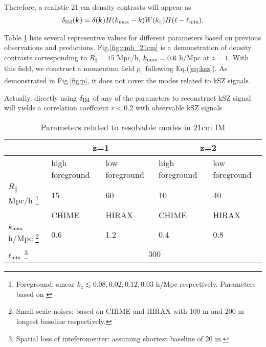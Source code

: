 Therefore, a realistic 21 cm density contrasts will appear as 
\begin{eqnarray}
\label{eq:ns}
    \delta_\mathrm{IM}(\bm{k})=\delta(\bm{k})H(k_\mathrm{max}-k)W(k_\parallel)H(\ell-\ell_\mathrm{min}),
\end{eqnarray}

Table.\ref{tab:para} 
lists several representive values for different parameters 
based on previous observations and predictions. 
Fig.\ref{fig:cmb_21cm} 
is a demonstration of density contrasts corresponding to 
$R_\parallel=15$ Mpc/h, $k_\mathrm{max}=0.6$ h/Mpc 
at $z=1$. 
With this field, 
we construct a momentum field $p_\parallel$ following Eq.(\ref{eq:ksz}). 
As demonstrated in Fig.\ref{fig:p}, 
it does not cover the modes related to kSZ signals. 

Actually, directly using $\delta_\mathrm{IM}$ of any of the parameters 
to reconstruct kSZ signal will 
yields a correlation coeffcient $r<0.2$ 
with observable kSZ signals 

\begin{table}
\begin{tabular}{|m{2cm}|m{1.5cm}|m{1.5cm}|m{1.5cm}|m{1.5cm}|}
    \hline
     & \multicolumn{2}{|c|}{z=1} &\multicolumn{2}{|c|}{z=2}\\
     \hline
     & high foreground &low foreground&high foreground& low foreground\\
     \cline{2-5}
     $R_\parallel$ Mpc/h
     \footnote{Foreground: smear $k_z\lesssim 0.08,0.02,0.12,0.03$ h/Mpc respectively. Parameters based on \cite{2013ApJ...763L..20M,Switzer13,15Shaw}}
      & 15 & 60 & 10 & 40 \\
     \hline
     & CHIME & HIRAX & CHIME &HIRAX\\
     \cline{2-5}
     $k_\mathrm{max}$ h/Mpc 
     \footnote{Small scale noises: based on CHIME\cite{2014CHIME} and HIRAX\cite{HIRAX} 
     with 100 m and 200 m longest baseline respectively.}
     & 0.6 & 1.2 & 0.4 & 0.8 \\
     \hline
     $\ell_\mathrm{min}$
     \footnote{Spatial loss of inteferomenter: assuming shortest baseline of 20 m.}
     & \multicolumn{4}{|c|}{300} \\
     \hline
\end{tabular}
     \caption{Parameters related to resolvable modes in 21cm IM}
     \label{tab:para}
\end{table}

